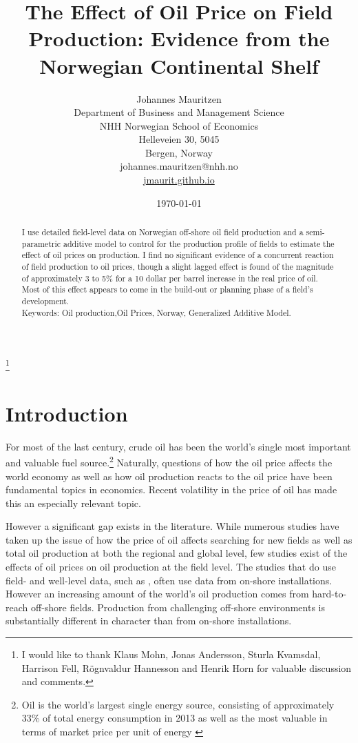 \documentclass[11pt]{article}
\title{The Effect of Oil Price on Field Production: Evidence from the Norwegian Continental Shelf}
\author{Johannes Mauritzen\\
		Department of Business and Management Science\\
        NHH Norwegian School of Economics\\
        Helleveien 30, 5045\\
        Bergen, Norway\\
        johannes.mauritzen@nhh.no\\
        \url{jmaurit.github.io}\\
		}
\date{\today}
\begin{document}
 \begin{spacing}{1} %
	\maketitle


\begin{abstract}
I use detailed field-level data on Norwegian off-shore oil field production and a semi-parametric additive model to control for the production profile of fields to estimate the effect of oil prices on production.  I find no significant evidence of a concurrent reaction of field production to oil prices, though a slight lagged effect is found of the magnitude of approximately 3 to 5\% for a 10 dollar per barrel increase in the real price of oil.  Most of this effect appears to come in the build-out or planning phase of a field's development.\\
Keywords: Oil production,Oil Prices, Norway, Generalized Additive Model.
\end{abstract}

\thanks{I would like to thank Klaus Mohn, Jonas Andersson, Sturla Kvamsdal, Harrison Fell, R\"ognvaldur Hannesson and Henrik Horn for valuable discussion and comments.}
 \end{spacing}

\section{Introduction}

For most of the last century, crude oil has been the world’s single most important and valuable fuel source.\footnote{Oil is the world's largest single energy source, consisting of approximately 33\% of total energy consumption in 2013 as well as the most valuable in terms of market price per unit of energy \citep{british_petroleum_statistical_2013}} Naturally, questions of how the oil price affects the world economy as well as how oil production reacts to the oil price have been fundamental topics in economics. Recent volatility in the price of oil has made this an especially relevant topic. 

However a significant gap exists in the literature.  While numerous studies have taken up the issue of how the price of oil affects searching for new fields as well as total oil production at both the regional and global level, few studies exist of the effects of oil prices on oil production at the field level.  The studies that do use field- and well-level data, such as \citet{rao_taxation_2010}, often use data from on-shore installations.  However an increasing amount of the world's oil production comes from hard-to-reach off-shore fields.  Production from challenging off-shore environments is substantially different in character than from on-shore installations.
\end{document}

